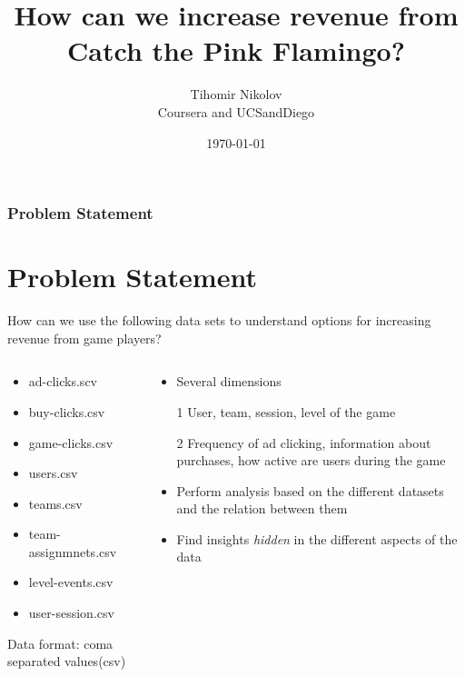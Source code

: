 \documentclass[10pt]{beamer}
\title{How can we increase revenue 
	from
	Catch the Pink Flamingo?}
\author{Tihomir Nikolov \\ Coursera and UCSandDiego}
\date{\small \today}
\begin{document}
\begin{frame}

\end{frame}

\begin{frame}
 \frametitle{Problem Statement}
 \section{Problem Statement}
\small{How can we use the following data sets to understand options for increasing revenue from game players?}

  \begin{columns}
  \begin{column}{.5 \textwidth}

  \begin{small} 
  \begin{itemize}
      \item ad-clicks.scv
      \item buy-clicks.csv
      \item game-clicks.csv
      \item users.csv
      \item teams.csv
      \item team-assignmnets.csv
      \item level-events.csv
      \item user-session.csv
  \end{itemize}
  \end{small}
Data format: coma separated values(csv)
\end{column}
\begin{column}{.5 \textwidth}
	\begin{itemize}
		\item Several dimensions
		\item[1] User, team, session, level of the game
		\item[2] Frequency of ad clicking, information about purchases, how active are users during the game
		\item Perform analysis based on the different datasets and the relation between them
		\item Find insights \emph{hidden} in the different aspects of the data
	\end{itemize}
\end{column}


\end{columns}
\end{frame}
\end{document}
